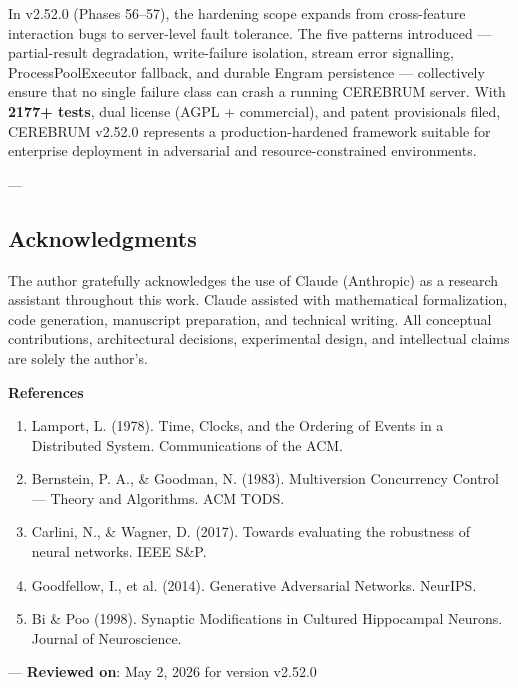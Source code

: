 In v2.52.0 (Phases 56–57), the hardening scope expands from cross-feature interaction bugs to server-level fault tolerance. The five patterns introduced — partial-result degradation, write-failure isolation, stream error signalling, ProcessPoolExecutor fallback, and durable Engram persistence — colle\-ctively ensure that no single failure class can crash a running CEREBRUM server. With \textbf{2177+ tests}, dual license (AGPL + commercial), and patent provi\-sionals filed, CEREBRUM v2.52.0 represents a production-hardened framework suitable for enterprise deployment in adversarial and resource-constrained envir\-onments.

---
\subsection{Acknow\-ledgments}

The author gratefully ackno\-wledges the use of Claude (Anthropic) as a research assistant throughout this work. Claude assisted with mathe\-matical forma\-lization, code generation, manuscript preparation, and technical writing. All conceptual contr\-ibutions, archi\-tectural decisions, exper\-imental design, and intel\-lectual claims are solely the author's.

\textbf{References}
\begin{enumerate}
\item Lamport, L. (1978). Time, Clocks, and the Ordering of Events in a Distributed System. Commun\-ications of the ACM.
\item Bernstein, P. A., \& Goodman, N. (1983). Multiv\-ersion Concurrency Control — Theory and Algorithms. ACM TODS.
\item Carlini, N., \& Wagner, D. (2017). Towards evaluating the robustness of neural networks. IEEE S\&P.
\item Goodfellow, I., et al. (2014). Generative Adversarial Networks. NeurIPS.
\item Bi \& Poo (1998). Synaptic Modifi\-cations in Cultured Hippocampal Neurons. Journal of Neuros\-cience.

\end{enumerate}
---
\textbf{Reviewed on}: May 2, 2026 for version v2.52.0
